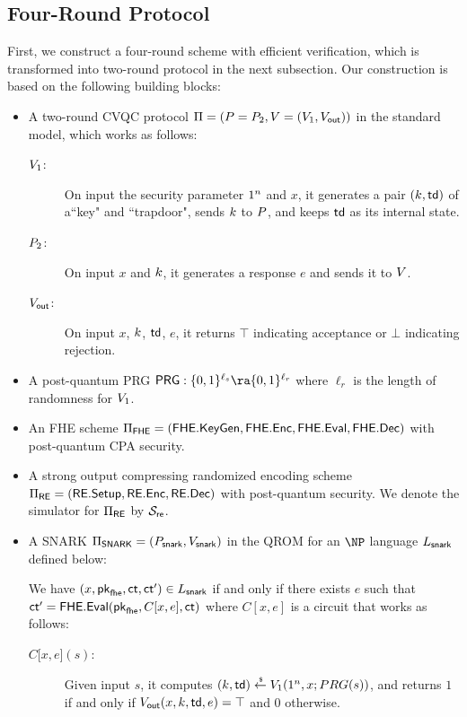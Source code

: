 \subsection{Four-Round Protocol}\label{sec:efficient-four}
First, we construct a four-round scheme with efficient verification, which is transformed into two-round protocol in the next subsection.
Our construction is based on the following building blocks:
\begin{itemize}
\item A two-round CVQC protocol $\Pi=(P=P_2,V=(V_1,V_{\mathsf{out}}))$ in the standard model, which works as follows: 
\begin{description}
\item[$V_1$:] On input the security parameter $1^n$ and $x$, it generates a pair $(k,\mathsf{td})$ of a``key" and ``trapdoor", sends $k$ to $P$, and keeps $\mathsf{td}$ as its internal state.
\item[$P_2$:] On input $x$ and $k$, it generates a response $e$ and sends it to $V$.
\item[$V_{\mathsf{out}}$:] On input $x$, $k$, $\mathsf{td}$, $e$, it returns $\top$ indicating acceptance or $\bot$ indicating rejection.
\end{description}

\item A post-quantum PRG $\PRG:\bit^{\ell_s}\ra \bit^{\ell_r}$ where $\ell_r$ is the length of randomness for $V_1$.


\item An FHE scheme $\Pi_{\mathsf{FHE}}=(\mathsf{FHE}.\mathsf{KeyGen},\mathsf{FHE}.\mathsf{Enc},\mathsf{FHE}.\mathsf{Eval},\mathsf{FHE}.\mathsf{Dec})$ with post-quantum CPA security.

\item A strong output compressing randomized encoding scheme $\Pi_{\mathsf{RE}}=(\mathsf{RE}.\mathsf{Setup},\mathsf{RE}.\mathsf{Enc},\mathsf{RE}.\mathsf{Dec})$ with post-quantum security. We denote the simulator for $\Pi_{\mathsf{RE}}$ by $\mathcal{S}_{\mathsf{re}}$.

\item A SNARK $\Pi_{\mathsf{SNARK}}=(P_{\mathsf{snark}},V_{\mathsf{snark}})$ in the QROM for an $\NP$ language $L_{\mathsf{snark}}$ defined below:  

We have $(x,\mathsf{pk}_{\mathsf{fhe}},\mathsf{ct},\mathsf{ct}')\in L_{\mathsf{snark}}$
if and only if there exists $e$ such that
$\mathsf{ct}'= \mathsf{FHE}.\mathsf{Eval}(\mathsf{pk}_{\mathsf{fhe}},\allowbreak C[x,e],\mathsf{ct})$ where $C[x,e]$ is a circuit that works as follows:
\begin{description}
\item[$C{[}x,e{]}(s)$:] Given input $s$, it computes $(k,\mathsf{td})\overset{\hspace{0.1em}\mathsf{\scriptscriptstyle\$}}{\leftarrow} V_1(1^n,x;PRG(s))$, and returns $1$ if and only if $V_{\mathsf{out}}(x,k,\mathsf{td},e)=\top$ and $0$ otherwise. 
\end{description}


\end{itemize}
